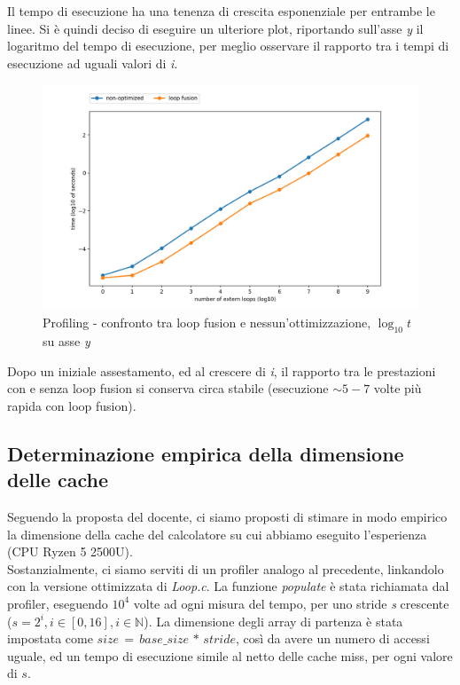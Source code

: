 \documentclass[letterpaper, 11pt]{article}
\begin{document}
\begin{multicols}{2}
  Il tempo di esecuzione ha una tenenza di crescita esponenziale per entrambe le linee. Si è quindi deciso di eseguire un ulteriore plot, riportando sull'asse \textit{y} il logaritmo del tempo di esecuzione, per meglio osservare il rapporto tra i tempi di esecuzione ad uguali valori di \textit{i}.

  \begin{figure}[H]
    \centering
    \includegraphics[width = 1.1 \linewidth]{../LocalOpts/graph_log.png}
    \caption{Profiling - confronto tra loop fusion e nessun'ottimizzazione, $\log_{10}{t}$ su asse \textit{y}}
  \end{figure}

  Dopo un iniziale assestamento, ed al crescere di \textit{i}, il rapporto tra le prestazioni con e senza loop fusion si conserva circa stabile (esecuzione $\sim 5-7$ volte più rapida con loop fusion).

  \subsection{Determinazione empirica della dimensione delle cache}
  Seguendo la proposta del docente, ci siamo proposti di stimare in modo empirico la dimensione della cache del calcolatore su cui abbiamo eseguito l'esperienza (CPU Ryzen 5 2500U).\\
  Sostanzialmente, ci siamo serviti di un profiler analogo al precedente, linkandolo con la versione ottimizzata di \textit{Loop.c}. La funzione \textit{populate} è stata richiamata dal profiler, eseguendo $10^4$ volte ad ogni misura del tempo, per uno stride \textit{s} crescente ($s = 2^i, i \in [0, 16], i \in \mathbb{N}$). La dimensione degli array di partenza è stata impostata come $size \, = \, base\_size \, * \, stride$, così da avere un numero di accessi uguale, ed un tempo di esecuzione simile al netto delle cache miss, per ogni valore di $s$.


\end{multicols}
\end{document}
